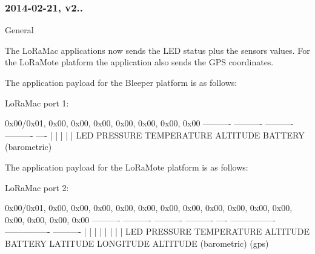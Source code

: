 \subsubsection*{2014-\/02-\/21, v2..}


\begin{DoxyItemize}
\item General
\begin{DoxyEnumerate}
\item The Lo\+Ra\+Mac applications now sends the L\+ED status plus the sensors values. For the Lo\+Ra\+Mote platform the application also sends the G\+PS coordinates.
\begin{DoxyItemize}
\item The application payload for the Bleeper platform is as follows\+:

Lo\+Ra\+Mac port 1\+: \begin{DoxyVerb} { 0x00/0x01, 0x00, 0x00, 0x00, 0x00, 0x00, 0x00, 0x00 }
  ----------  ----------  ----------  ----------  ----
       |           |           |           |        |
      LED      PRESSURE   TEMPERATURE  ALTITUDE  BATTERY
                                     (barometric)
\end{DoxyVerb}

\item The application payload for the Lo\+Ra\+Mote platform is as follows\+:

Lo\+Ra\+Mac port 2\+: \begin{DoxyVerb} { 0x00/0x01, 0x00, 0x00, 0x00, 0x00, 0x00, 0x00, 0x00, 0x00, 0x00, 0x00, 0x00, 0x00, 0x00, 0x00, 0x00 }
  ----------  ----------  ----------  ----------  ----  ----------------  ----------------  ----------
       |           |           |           |        |           |                 |              |
      LED      PRESSURE   TEMPERATURE  ALTITUDE  BATTERY    LATITUDE          LONGITUDE      ALTITUDE
                                     (barometric)                                              (gps)
\end{DoxyVerb}


\end{DoxyItemize}
\end{DoxyEnumerate}
\end{DoxyItemize}
